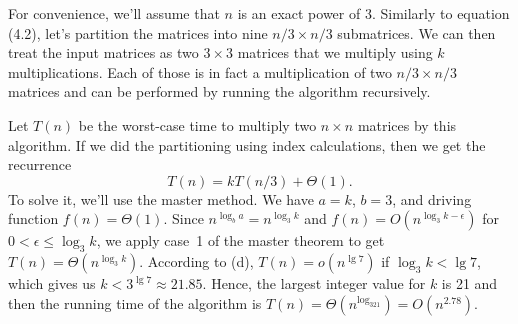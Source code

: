 For convenience, we'll assume that $n$ is an exact power of 3.
Similarly to equation (4.2), let's partition the matrices into nine $n/3\times n/3$ submatrices.
We can then treat the input matrices as two $3\times3$ matrices that we multiply using $k$ multiplications.
Each of those is in fact a multiplication of two $n/3\times n/3$ matrices and can be performed by running the algorithm recursively.

Let $T(n)$ be the worst-case time to multiply two $n\times n$ matrices by this algorithm.
If we did the partitioning using index calculations, then we get the recurrence
\[
    T(n) = kT(n/3)+\Theta(1).
\]
To solve it, we'll use the master method.
We have $a=k$, $b=3$, and driving function $f(n)=\Theta(1)$.
Since $n^{\log_ba}=n^{\log_3k}$ and $f(n)=O(n^{\log_3k-\epsilon})$ for $0<\epsilon\le\log_3k$, we apply case~1 of the master theorem to get $T(n)=\Theta(n^{\log_3k})$.
According to (d), $T(n)=o(n^{\lg7})$ if $\log_3k<\lg7$, which gives us $k<3^{\lg7}\approx21.85$.
Hence, the largest integer value for $k$ is 21 and then the running time of the algorithm is $T(n)=\Theta(n^{\log_321})=O(n^{2.78})$.
